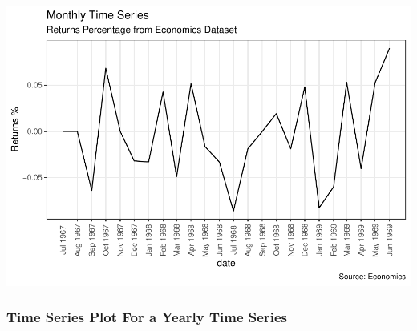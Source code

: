 \documentclass[a4paper]{article}
\begin{document}
\includegraphics{M24-ggplot2_Gallery_files/figure-latex/unnamed-chunk-43-1.pdf}
\newpage

\subsubsection{Time Series Plot For a Yearly Time
Series}\label{time-series-plot-for-a-yearly-time-series}
\end{document}
